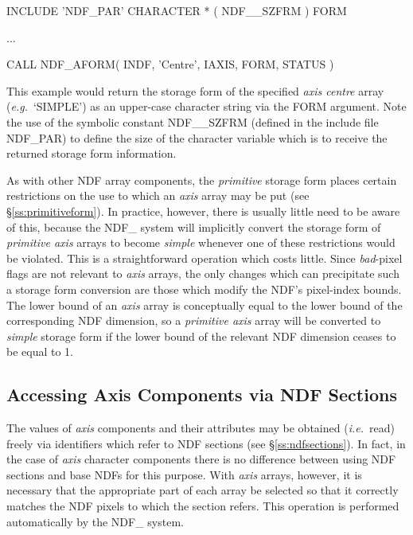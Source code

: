 \documentclass[twoside,11pt,nolof]{starlink}
\providecommand{\st}[1]{{\emph{#1}}}
\begin{document}
\small
\begin{terminalv}
      INCLUDE 'NDF_PAR'
      CHARACTER * ( NDF__SZFRM ) FORM

      ...

      CALL NDF_AFORM( INDF, 'Centre', IAXIS, FORM, STATUS )
\end{terminalv}
\normalsize

This example would return the storage form of the specified \st{axis
centre\/} array (\st{e.g.}\ `SIMPLE') as an upper-case character string via
the FORM argument.
Note the use of the symbolic constant NDF\_\_SZFRM (defined in the include
file NDF\_PAR) to define the size of the character variable which is to
receive the returned storage form information.

As with other NDF array components, the \st{primitive\/} storage form
places certain restrictions on the use to which an \st{axis\/} array may be
put (see \S\ref{ss:primitiveform}).
In practice, however, there is usually little need to be aware of this,
because the NDF\_ system will implicitly convert the storage form of
\st{primitive axis\/} arrays to become \st{simple\/} whenever one of
these
restrictions would be violated.
This is a straightforward operation which costs little.
Since \st{bad\/}-pixel flags are not relevant to \st{axis\/} arrays, the
only changes which can precipitate such a storage form conversion are those
which modify the NDF's pixel-index bounds.
The lower bound of an \st{axis\/} array is conceptually equal to the lower
bound of the corresponding NDF dimension, so a \st{primitive axis\/} array
will be converted to \st{simple\/} storage form if the lower bound of the
relevant NDF dimension ceases to be equal to 1.

\subsection{Accessing Axis Components via NDF Sections}

The values of \st{axis\/} components and their attributes may be obtained
(\st{i.e.}\ read) freely via identifiers which refer to NDF sections (see
\S\ref{ss:ndfsections}).
In fact, in the case of \st{axis\/} character components there is no
difference between using NDF sections and base NDFs for this purpose.
With \st{axis\/} arrays, however, it is necessary that the appropriate
part of each array be selected so that it correctly matches the NDF pixels
to which the section refers.
This operation is performed automatically by the NDF\_ system.
\end{document}
